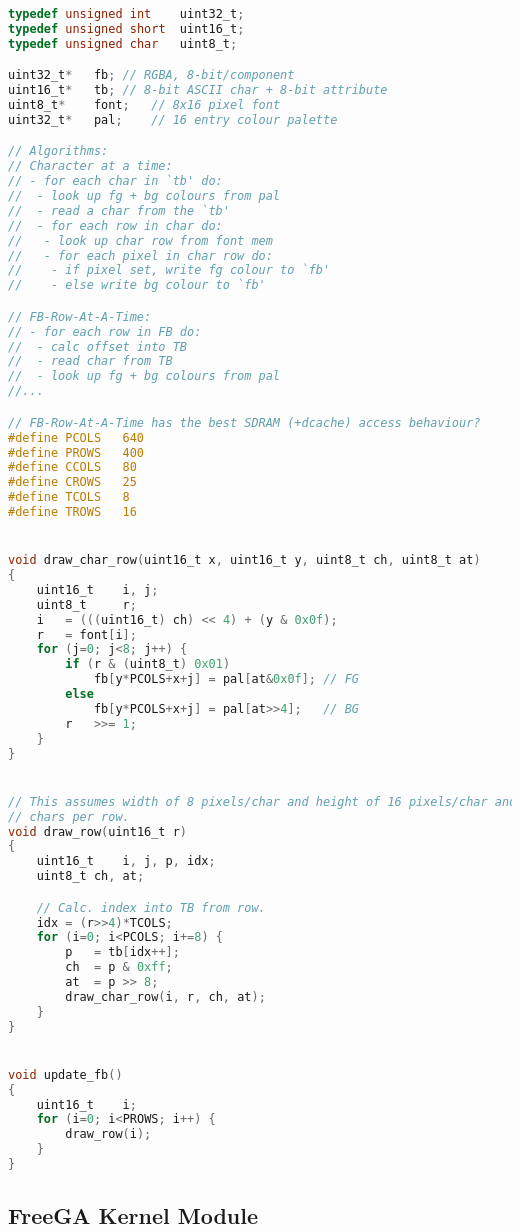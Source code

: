 \begin{lstlisting}[language=C,label=C_Code_Text_Mode]
typedef unsigned int	uint32_t;
typedef unsigned short	uint16_t;
typedef unsigned char	uint8_t;

uint32_t*	fb;	// RGBA, 8-bit/component
uint16_t*	tb;	// 8-bit ASCII char + 8-bit attribute
uint8_t*	font;	// 8x16 pixel font
uint32_t*	pal;	// 16 entry colour palette

// Algorithms:
// Character at a time:
// - for each char in `tb' do:
//  - look up fg + bg colours from pal
//  - read a char from the `tb'
//  - for each row in char do:
//   - look up char row from font mem
//   - for each pixel in char row do:
//    - if pixel set, write fg colour to `fb'
//    - else write bg colour to `fb'

// FB-Row-At-A-Time:
// - for each row in FB do:
//  - calc offset into TB
//  - read char from TB
//  - look up fg + bg colours from pal
//...

// FB-Row-At-A-Time has the best SDRAM (+dcache) access behaviour?
#define	PCOLS	640
#define	PROWS	400
#define	CCOLS	80
#define	CROWS	25
#define	TCOLS	8
#define	TROWS	16


void draw_char_row(uint16_t x, uint16_t y, uint8_t ch, uint8_t at)
{
	uint16_t	i, j;
	uint8_t		r;
	i	= (((uint16_t) ch) << 4) + (y & 0x0f);
	r	= font[i];
	for (j=0; j<8; j++) {
		if (r & (uint8_t) 0x01)
			fb[y*PCOLS+x+j]	= pal[at&0x0f];	// FG
		else
			fb[y*PCOLS+x+j]	= pal[at>>4];	// BG
		r	>>= 1;
	}
}


// This assumes width of 8 pixels/char and height of 16 pixels/char and 80
// chars per row.
void draw_row(uint16_t r)
{
	uint16_t	i, j, p, idx;
	uint8_t	ch, at;

	// Calc. index into TB from row.
	idx	= (r>>4)*TCOLS;
	for (i=0; i<PCOLS; i+=8) {
		p	= tb[idx++];
		ch	= p & 0xff;
		at	= p >> 8;
		draw_char_row(i, r, ch, at);
	}
}


void update_fb()
{
	uint16_t	i;
	for (i=0; i<PROWS; i++) {
		draw_row(i);
	}
}
\end{lstlisting}


\subsection{FreeGA Kernel Module}

